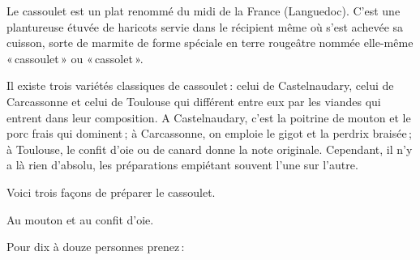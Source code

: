 Le cassoulet est un plat renommé du midi de la France (Languedoc). C'est une
plantureuse étuvée de haricots servie dans le récipient même où s'est achevée
sa cuisson, sorte de marmite de forme spéciale en terre rougeâtre nommée
elle-même « cassoulet » ou « cassolet ».

Il existe trois variétés classiques de cassoulet : celui de Castelnaudary,
celui de Carcassonne et celui de Toulouse qui différent entre eux par les
viandes qui entrent dans leur composition. A Castelnaudary, c'est la poitrine
de mouton et le porc frais qui dominent ; à Carcassonne, on emploie le gigot et
la perdrix braisée ; à Toulouse, le confit d’oie ou de canard donne la note
originale. Cependant, il n'y a là rien d'absolu, les préparations empiétant
souvent l'une sur l'autre.

\medskip

Voici trois façons de préparer le cassoulet.

\medskip

Au mouton et au confit d'oie.

\medskip

Pour dix à douze personnes prenez :

